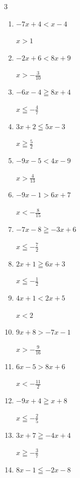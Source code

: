 \begin{multicols}{3}
\begin{enumerate}
        $\displaystyle x\geqq \frac{2}{13}$

  \item $-7x+4<x-4$

        $\displaystyle x>1$

  \item $-2x+6<8x+9$

        $\displaystyle x>-\frac{3}{10}$

  \item $-6x-4\geqq 8x+4$

        $\displaystyle x\leqq -\frac{4}{7}$

  \item $3x+2\leqq 5x-3$

        $\displaystyle x\geqq \frac{5}{2}$

  \item $-9x-5<4x-9$

        $\displaystyle x>\frac{4}{13}$

  \item $-9x-1>6x+7$

        $\displaystyle x<-\frac{8}{15}$

  \item $-7x-8\geqq -3x+6$

        $\displaystyle x\leqq -\frac{7}{2}$

  \item $2x+1\geqq 6x+3$

        $\displaystyle x\leqq -\frac{1}{2}$

  \item $4x+1<2x+5$

        $\displaystyle x<2$

  \item $9x+8>-7x-1$

        $\displaystyle x>-\frac{9}{16}$

  \item $6x-5>8x+6$

        $\displaystyle x<-\frac{11}{2}$

  \item $-9x+4\geqq x+8$

        $\displaystyle x\leqq -\frac{2}{5}$

  \item $3x+7\geqq -4x+4$

        $\displaystyle x\geqq -\frac{3}{7}$

\columnbreak %

  \item $8x-1\leqq -2x-8$


\end{enumerate}
\end{multicols}
